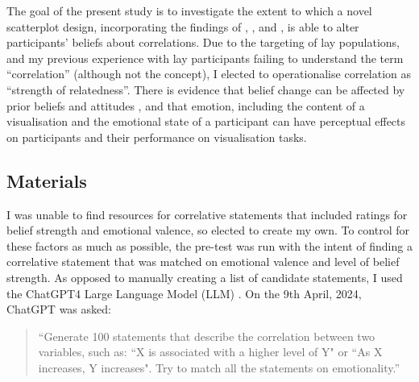 \documentclass[../main.tex]{subfiles}
\begin{document}
The goal of the present study is to investigate the extent to which a
novel scatterplot design, incorporating the findings of
, , and
, is able to alter participants'
beliefs about correlations. Due to the targeting of lay populations, and
my previous experience with lay participants failing to understand the
term ``correlation'' (although not the concept), I elected to
operationalise correlation as ``strength of relatedness''. There is
evidence that belief change can be affected by prior beliefs and
attitudes \cite{markant_2023, xiong_2023}, and that emotion, including
the content of a visualisation \cite{phelps_2006, harrison_2013} and the
emotional state of a participant \cite{thoresen_2016} can have
perceptual effects on participants and their performance on
visualisation tasks.

\subsection{Materials}\label{materials-e5a}

I was unable to find resources for correlative statements that included
ratings for belief strength and emotional valence, so elected to create
my own. To control for these factors as much as possible, the pre-test
was run with the intent of finding a correlative statement that was
matched on emotional valence and level of belief strength. As opposed to
manually creating a list of candidate statements, I used the ChatGPT4
Large Language Model (LLM) \cite{chatGPT}. On the 9th April, 2024,
ChatGPT was asked:

\begin{quotation}
    ``Generate 100 statements that describe the correlation between two variables, such as:
     ``X is associated with a higher level of Y" or
     ``As X increases, Y increases".
    Try to match all the statements on emotionality.''
\end{quotation}
\end{document}
